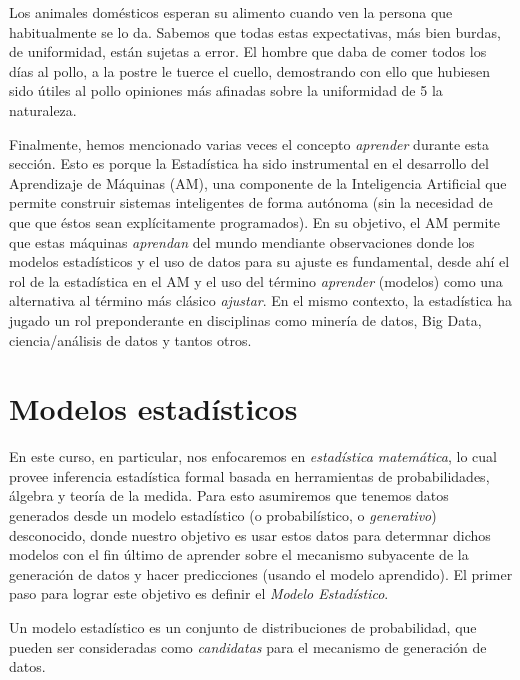 \begin{displayquote}   
Los animales domésticos esperan su alimento
cuando ven la persona que habitualmente se lo da. Sabemos que todas estas
expectativas, más bien burdas, de uniformidad, están sujetas a error. El hombre que
daba de comer todos los días al pollo, a la postre le tuerce el cuello, demostrando con
ello que hubiesen sido útiles al pollo opiniones más afinadas sobre la uniformidad de
5 la naturaleza.
\end{displayquote}

Finalmente, hemos mencionado varias veces el concepto \emph{aprender} durante esta sección. Esto es porque la Estadística ha sido instrumental en el desarrollo del Aprendizaje de Máquinas (AM),  una componente de la Inteligencia Artificial que permite construir sistemas inteligentes de forma autónoma (sin la necesidad de que que éstos sean explícitamente programados). En su objetivo, el AM permite que estas máquinas \emph{aprendan} del mundo mendiante observaciones donde los modelos estadísticos y el uso de datos para su ajuste es fundamental, desde ahí el rol de la estadística en el AM y el uso del término \emph{aprender} (modelos) como una alternativa al término más clásico \emph{ajustar}. En el mismo contexto, la estadística ha jugado un rol preponderante en disciplinas como minería de datos, Big Data, ciencia/análisis de datos y tantos otros. 


\section{Modelos estadísticos}


En este curso, en particular, nos enfocaremos en  \emph{estadística matemática}, lo cual provee inferencia estadística formal basada en herramientas de probabilidades, álgebra y teoría de la medida. Para esto asumiremos que tenemos datos generados desde un modelo estadístico (o probabilístico, o \emph{generativo}) desconocido, donde nuestro objetivo es usar estos datos para determnar dichos modelos con el fin 
último de aprender sobre el mecanismo subyacente de la generación de datos y hacer predicciones (usando el modelo aprendido). El primer paso para lograr este objetivo es definir el \emph{Modelo Estadístico}.

\begin{definition} 
Un modelo estadístico es un conjunto de distribuciones de probabilidad, que pueden ser consideradas como \emph{candidatas} para el mecanismo de generación de datos. 
\end{definition}

